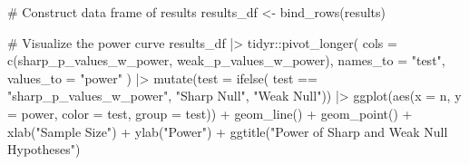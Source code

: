 \documentclass[
  letterpaper,
  DIV=11,
  numbers=noendperiod]{scrartcl}
\newenvironment{Shaded}{\begin{snugshade}}{\end{snugshade}}
\newcommand{\AttributeTok}[1]{\textcolor[rgb]{0.40,0.45,0.13}{#1}}
\newcommand{\CommentTok}[1]{\textcolor[rgb]{0.37,0.37,0.37}{#1}}
\newcommand{\FunctionTok}[1]{\textcolor[rgb]{0.28,0.35,0.67}{#1}}
\newcommand{\NormalTok}[1]{\textcolor[rgb]{0.00,0.23,0.31}{#1}}
\newcommand{\OtherTok}[1]{\textcolor[rgb]{0.00,0.23,0.31}{#1}}
\newcommand{\SpecialCharTok}[1]{\textcolor[rgb]{0.37,0.37,0.37}{#1}}
\newcommand{\StringTok}[1]{\textcolor[rgb]{0.13,0.47,0.30}{#1}}
\begin{document}
\begin{Shaded}
\begin{Highlighting}[]
\CommentTok{\# Construct data frame of results}
\NormalTok{results\_df }\OtherTok{\textless{}{-}} \FunctionTok{bind\_rows}\NormalTok{(results)}

\CommentTok{\# Visualize the power curve}
\NormalTok{results\_df }\SpecialCharTok{|\textgreater{}} 
\NormalTok{  tidyr}\SpecialCharTok{::}\FunctionTok{pivot\_longer}\NormalTok{(}
    \AttributeTok{cols =} \FunctionTok{c}\NormalTok{(sharp\_p\_values\_w\_power, weak\_p\_values\_w\_power),}
    \AttributeTok{names\_to =} \StringTok{"test"}\NormalTok{,}
    \AttributeTok{values\_to =} \StringTok{"power"}
\NormalTok{  ) }\SpecialCharTok{|\textgreater{}} 
  \FunctionTok{mutate}\NormalTok{(}\AttributeTok{test =} \FunctionTok{ifelse}\NormalTok{(}
\NormalTok{    test }\SpecialCharTok{==} \StringTok{"sharp\_p\_values\_w\_power"}\NormalTok{, }\StringTok{"Sharp Null"}\NormalTok{, }\StringTok{"Weak Null"}\NormalTok{)) }\SpecialCharTok{|\textgreater{}}
  \FunctionTok{ggplot}\NormalTok{(}\FunctionTok{aes}\NormalTok{(}\AttributeTok{x =}\NormalTok{ n, }\AttributeTok{y =}\NormalTok{ power, }\AttributeTok{color =}\NormalTok{ test, }\AttributeTok{group =}\NormalTok{ test)) }\SpecialCharTok{+} 
  \FunctionTok{geom\_line}\NormalTok{() }\SpecialCharTok{+} 
  \FunctionTok{geom\_point}\NormalTok{() }\SpecialCharTok{+} 
  \FunctionTok{xlab}\NormalTok{(}\StringTok{"Sample Size"}\NormalTok{) }\SpecialCharTok{+} 
  \FunctionTok{ylab}\NormalTok{(}\StringTok{"Power"}\NormalTok{) }\SpecialCharTok{+} 
  \FunctionTok{ggtitle}\NormalTok{(}\StringTok{"Power of Sharp and Weak Null Hypotheses"}\NormalTok{)}
\end{Highlighting}
\end{Shaded}
\end{document}
